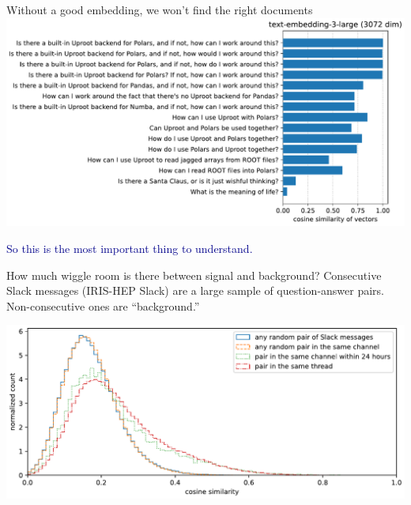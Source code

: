 \documentclass[aspectratio=169]{beamer}
\begin{document}
\begin{frame}{Without a good embedding, we won't find the right documents}
\vspace{0.5 cm}
\includegraphics[width=\linewidth]{PLOTS/experiments-with-similarity.pdf}

\vspace{-0.75 cm}
\textcolor{darkblue}{So this is the most important thing to understand.}
\vspace{0.75 cm}
\end{frame}

\begin{frame}{How much wiggle room is there between signal and background?}
\large
\vspace{0.5 cm}
Consecutive Slack messages (IRIS-HEP Slack) are a large sample of question-answer pairs. Non-consecutive ones are ``background.''

\vspace{0.25 cm}
\includegraphics[width=\linewidth]{PLOTS/slack-similarity-in-and-out-of-threads.pdf}
\end{frame}
\end{document}
